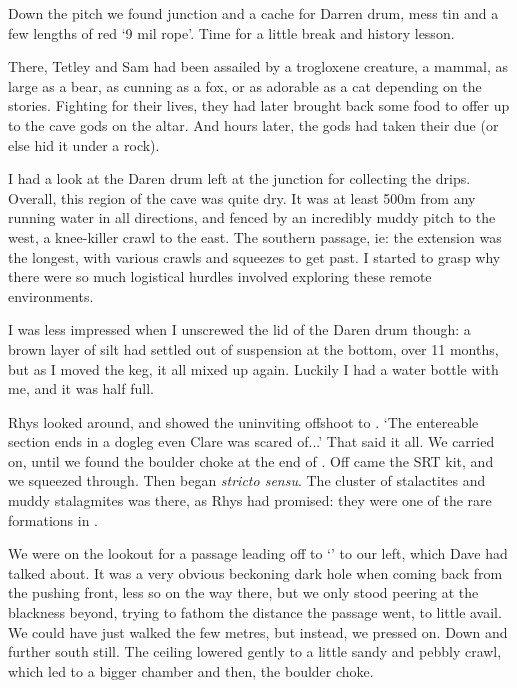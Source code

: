 Down the pitch we found  junction and a cache for Darren drum, mess tin and a few lengths of red `9 mil rope'. Time for a little break and history lesson. 

There, Tetley and Sam had been assailed by a trogloxene creature, a mammal, as large as a bear, as cunning as a fox, or as adorable as a cat depending on the stories. Fighting for their lives, they had later brought back some food to offer up to the cave gods on the  altar. And hours later, the gods had taken their due (or else hid it under a rock). 


I had a look at the Daren drum left at the junction for collecting the drips. Overall, this region of the cave was quite dry. It was at least 500m from any running water in all directions, and fenced by an incredibly muddy pitch to the west, a knee-killer crawl to the east. The southern passage, ie: the  extension was the longest, with various crawls and squeezes to get past. I started to grasp why there were so much logistical hurdles involved exploring these remote environments.

I was less impressed when I unscrewed the lid of the Daren drum though: a brown layer of silt had settled out of suspension at the bottom, over 11 months, but as I moved the keg, it all mixed up again. Luckily I had a water bottle with me, and it was half full.

Rhys looked around, and showed the uninviting offshoot to . `The entereable section ends in a dogleg even Clare was scared of...' That said it all. We carried on, until we found the boulder choke at the end of . Off came the SRT kit, and we squeezed through. 
Then began  \emph{stricto sensu}. The cluster of stalactites and muddy stalagmites was there, as Rhys had promised: they were one of the rare formations in . 

We were on the lookout for a passage leading off to `' to our left, which Dave had talked about. It was a very obvious beckoning dark hole when coming back from the pushing front, less so on the way there, but we only stood peering at the blackness beyond, trying to fathom the distance the passage went, to little avail. We could have just walked the few metres, but instead, we pressed on. Down and further south still. The ceiling lowered gently to a little sandy and pebbly crawl, which led to a bigger chamber and then, the boulder choke.

